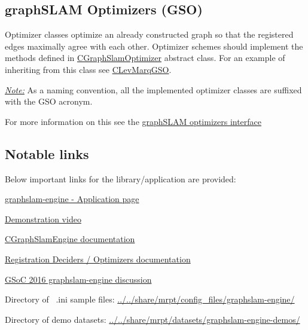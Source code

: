 \subsection{graphSLAM Optimizers (GSO)}

Optimizer classes optimize an already constructed graph so that the registered
edges maximally agree with each other. Optimizer schemes should implement the
methods defined in
\href{http://reference.mrpt.org/devel/classmrpt_1_1graphslam_1_1optimizers_1_1_c_graph_slam_optimizer.html}{CGraphSlamOptimizer}
abstract class. For an example of inheriting from this class see
\href{http://reference.mrpt.org/devel/classmrpt_1_1graphslam_1_1optimizers_1_1_c_lev_marq_g_s_o.html}{CLevMarqGSO}.

\ul{\textit{Note:}} As a naming convention, all the implemented optimizer
classes are suffixed with the GSO acronym.

For more information on this see the
\href{http://reference.mrpt.org/devel/classmrpt_1_1graphslam_1_1optimizers_1_1_c_graph_slam_optimizer.html}{graphSLAM optimizers interface}

\subsection{Notable links}
Below important links for the library/application are provided:
\begin{itemize*}
    \item \href{http://www.mrpt.org/list-of-mrpt-apps/application-graphslamengine/}{graphslam-engine
        - Application page}
    \item \href{https://www.youtube.com/watch?v=Pv0yvlzrcXk}{Demonstration video}
    \item \href{http://reference.mrpt.org/devel/structmrpt_1_1graphslam_1_1_c_graph_slam_engine_1_1_t_r_g_b_d_info_file_params.html}{CGraphSlamEngine documentation}
    \item \href{http://reference.mrpt.org/devel/classmrpt_1_1graphslam_1_1_c_registration_decider_or_optimizer.html}{Registration Deciders / Optimizers documentation}
    \item \href{https://github.com/MRPT/GSoC2016-discussions/issues/2#}{GSoC 2016
        graphslam-engine discussion}
    \item Directory of ~.ini sample files: \url{../../share/mrpt/config_files/graphslam-engine/}
    \item Directory of demo datasets: \url{../../share/mrpt/datasets/graphslam-engine-demos/}

\end{itemize*}

